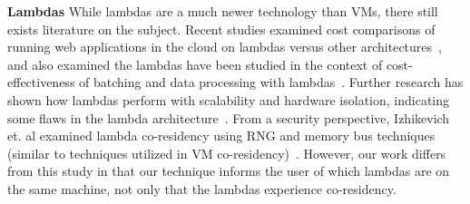 \noindent \textbf{Lambdas} 
While lambdas are a much newer technology than VMs, there still exists
literature on the subject. Recent studies examined cost comparisons of running
web applications in the cloud on lambdas versus other
architectures~\cite{villamizar2016}, and also examined the lambdas have been
studied in the context of cost-effectiveness of batching and data processing
with lambdas~\cite{kiran2015}.  Further research has shown how lambdas perform
with scalability and hardware isolation, indicating some flaws in the lambda
architecture~\cite{wangusenix2018}. From a security perspective, Izhikevich et.
al examined lambda co-residency using RNG and memory bus techniques (similar to
techniques utilized in VM co-residency)~\cite{izhikevich2018}. However, our work
differs from this study in that our technique informs the user of which lambdas
are on the same machine, not only that the lambdas experience co-residency.
